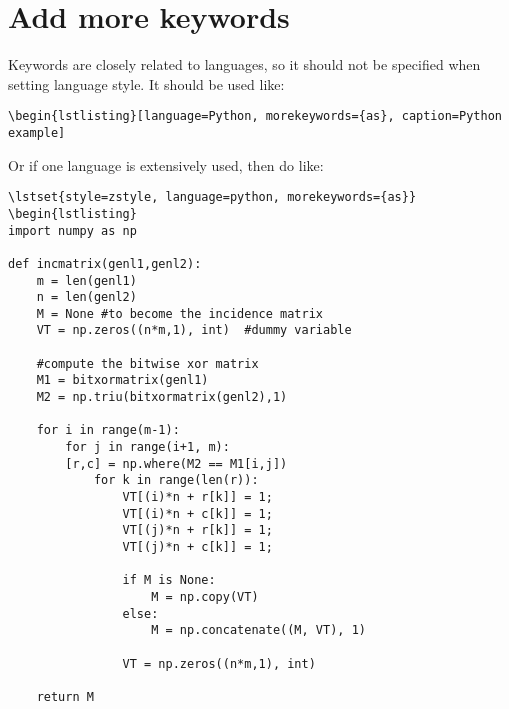 \section{Add more keywords}
Keywords are closely related to languages, so it should not be specified when setting language style. It should be used like:

\begin{lstlisting}[language={[LaTeX]TeX}]
\begin{lstlisting}[language=Python, morekeywords={as}, caption=Python example]
\end{lstlisting}

Or if one language is extensively used, then do like:

\begin{lstlisting}[language={[LaTeX]TeX}]
\lstset{style=zstyle, language=python, morekeywords={as}}
\begin{lstlisting}
import numpy as np

def incmatrix(genl1,genl2):
	m = len(genl1)
	n = len(genl2)
	M = None #to become the incidence matrix
	VT = np.zeros((n*m,1), int)  #dummy variable
	
	#compute the bitwise xor matrix
	M1 = bitxormatrix(genl1)
	M2 = np.triu(bitxormatrix(genl2),1) 
	
	for i in range(m-1):
		for j in range(i+1, m):
		[r,c] = np.where(M2 == M1[i,j])
			for k in range(len(r)):
				VT[(i)*n + r[k]] = 1;
				VT[(i)*n + c[k]] = 1;
				VT[(j)*n + r[k]] = 1;
				VT[(j)*n + c[k]] = 1;
				
				if M is None:
					M = np.copy(VT)
				else:
					M = np.concatenate((M, VT), 1)
				
				VT = np.zeros((n*m,1), int)

	return M
\end{lstlisting}
